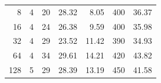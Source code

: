 \begin{table}[h!]
\begin{tabular}{rrrrrrr}
8                      & 4                          & 20                     & 28.32                                                                             & 8.05                                                                            & 400                                                                                  & 36.37                                                                            \\
16                     & 4                          & 24                     & 26.38                                                                             & 9.59                                                                            & 400                                                                                  & 35.98                                                                            \\
32                     & 4                          & 29                     & 23.52                                                                             & 11.42                                                                           & 390                                                                                  & 34.93                                                                            \\
64                     & 4                          & 34                     & 29.61                                                                             & 14.21                                                                           & 420                                                                                  & 43.82                                                                            \\
128                    & 5                          & 29                     & 28.39                                                                             & 13.19                                                                           & 450                                                                                  & 41.58                                                                           
\end{tabular}
\end{table}

